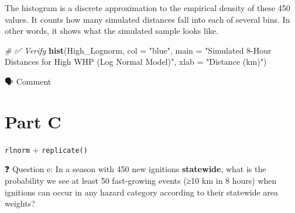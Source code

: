 \documentclass[
  12pt,
]{scrreprt}
\newenvironment{Shaded}{\begin{snugshade}}{\end{snugshade}}
\newcommand{\AttributeTok}[1]{\textcolor[rgb]{0.13,0.29,0.53}{#1}}
\newcommand{\CommentTok}[1]{\textcolor[rgb]{0.56,0.35,0.01}{\textit{#1}}}
\newcommand{\FunctionTok}[1]{\textcolor[rgb]{0.13,0.29,0.53}{\textbf{#1}}}
\newcommand{\NormalTok}[1]{#1}
\newcommand{\StringTok}[1]{\textcolor[rgb]{0.31,0.60,0.02}{#1}}
\begin{document}
The histogram is a discrete approximation to the empirical density of these 450 values. It counts how many simulated distances fall into each of several bins. In other words, it shows what the simulated sample looks like.

\begin{Shaded}
\begin{Highlighting}[]
\CommentTok{\# ✅  Verify}
\FunctionTok{hist}\NormalTok{(High\_Lognorm,}
     \AttributeTok{col    =} \StringTok{"blue"}\NormalTok{,}
     \AttributeTok{main   =} \StringTok{"Simulated 8{-}Hour Distances for High WHP (Log}
\StringTok{ Normal Model)"}\NormalTok{,}
     \AttributeTok{xlab   =} \StringTok{"Distance (km)"}\NormalTok{)}
\end{Highlighting}
\end{Shaded}

🗣 Comment

\chapter{Part C}\label{part-c}

\texttt{rlnorm} + \texttt{replicate()}

❓ Question e: In a season with 450 new ignitions \textbf{statewide}, what is the probability we see at least 50 fast-growing events (≥10 km in 8 hours) when ignitions can occur in any hazard category according to their statewide area weights?
\end{document}
